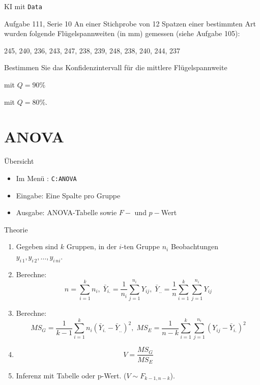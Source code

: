 \documentclass[handout]{beamer}
\newlength{\tikey}
\newcommand{\keystroke}[1]{\settowidth{\tikey}{\scriptsize #1}\psframebox[framearc=0.2]{\parbox{\tikey}{\scriptsize #1}}}
\begin{document}
\begin{frame}{KI mit \texttt{Data}}
\begin{beamerboxesrounded}[shadow]{Aufgabe 111, Serie 10}
An einer Stichprobe von 12 Spatzen einer bestimmten Art wurden folgende
Flügelspannweiten (in mm) gemessen (siehe Aufgabe 105):

\begin{center}
245, 240, 236, 243, 247, 238, 239, 248, 238, 240, 244, 237
\end{center}

Bestimmen Sie das Konfidenzintervall für die mittlere Flügelspannweite
\begin{outline}
\item mit $Q = 90\%$
\item mit $Q = 80\%$.
\end{outline}
\end{beamerboxesrounded}
\end{frame}

\section{ANOVA}
\begin{frame}{Übersicht}
\begin{itemize}
\item Im Menü \keystroke{F6}: \texttt{C:ANOVA}
\item Eingabe: Eine Spalte pro Gruppe
\item Ausgabe: ANOVA-Tabelle sowie $F-$ und $p-$Wert
\end{itemize}
\end{frame}

\begin{frame}{Theorie}
\begin{enumerate}
\item Gegeben sind $k$ Gruppen, in der $i$-ten Gruppe $n_i$ Beobachtungen
$y_{i\,1}, y_{i\,2}, \ldots, y_{i\,ni}$.
\item Berechne:
$$
n=\sum_{i=1}^k n_i,\;
\bar{Y}_{i.}=\frac{1}{n_i}\sum_{j=1}^{n_i}Y_{ij},\; 
\bar{Y}_{..}=\frac{1}{n}\sum_{i=1}^k\sum_{j=1}^{n_i}Y_{ij}
$$
\item Berechne:
$$
MS_G=\frac{1}{k-1}\sum_{i=1}^k n_i(\bar{Y}_{i.}-\bar{Y}_{..})^2,\;
MS_E=\frac{1}{n-k}\sum_{i=1}^k\sum_{j=1}^{n_i}(Y_{ij}-\bar{Y}_{i.})^2
$$
\item
$$
V=\frac{MS_G}{MS_E}
$$
\item Inferenz mit Tabelle oder p-Wert. ($V\sim F_{k-1,n-k}$).
\end{enumerate}
\end{frame}
\end{document}
